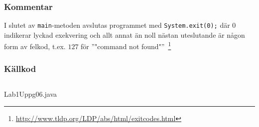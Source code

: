 \subsubsection{Kommentar}
\par I slutet av \texttt{main}-metoden avslutas programmet med
\texttt{System.exit(0);} där $0$ indikerar lyckad exekvering och allt annat än
noll nästan uteslutande är någon form av felkod, t.ex. $127$ för ''"command not found"''\ 
\footnote{\url{http://www.tldp.org/LDP/abs/html/exitcodes.html}}


\subsubsection{Källkod}\label{uppgift-6_src}
    \inputminted[linenos]{java}{src/Lab1Uppg06.java}
    \caption{Lab1Uppg06.java}
    \label{Uppg6src}
